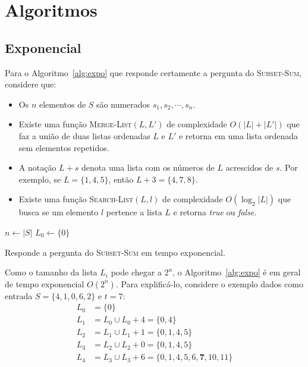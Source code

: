 \section{Algoritmos}

\subsection{Exponencial}

Para o Algoritmo~\ref{alg:expo} que responde certamente a pergunta do \textsc{Subset-Sum}, considere que:

\begin{itemize}
	\item Os $n$ elementos de $S$ são numerados ${s_1, s_2, \cdots, s_n}$.

	\item Existe uma função \textsc{Merge-List}$(L, L')$ de complexidade $O(|L| + |L'|)$ que faz a união de duas listas ordenadas $L$ e $L'$ e retorna em uma lista ordenada sem elementos repetidos.
	
	\item A notação $L + s$ denota uma lista com os números de $L$ acrescidos de $s$. Por exemplo, se $L = \{1, 4, 5\}$, então $L + 3 = \{4, 7, 8\}$.
	
	\item Existe uma função \textsc{Search-List}$(L, l)$ de complexidade $O(\log_{2} |L|)$ que busca se um elemento $l$ pertence a lista $L$ e retorna \textit{true} ou \textit{false}.
\end{itemize}

\begin{algorithm}[h]
	$n \leftarrow |S|$\;
	$L_0 \leftarrow \{0\}$\;
	\;
\caption{Responde a pergunta do \textsc{Subset-Sum} em tempo exponencial. \label{alg:expo}}
\end{algorithm}

Como o tamanho da lista $L_i$ pode chegar a $2^n$, o Algoritmo~\ref{alg:expo} é em geral de tempo exponencial $O(2^n)$. Para explificá-lo, considere o exemplo dados como entrada $S = \{4, 1, 0, 6, 2\}$ e $t = 7$:
	\begin{align*}
	L_0 & = \{0\} \\
	L_1 & = L_0 \cup L_0 + 4 = \{0, 4\} \\
	L_2 & = L_1 \cup L_1 + 1 = \{0, 1, 4, 5\} \\
	L_3 & = L_2 \cup L_2 + 0 = \{0, 1, 4, 5\} \\
	L_4 & = L_3 \cup L_3 + 6 = \{0, 1, 4, 5, 6, \mathbf{7}, 10, 11\}
	\end{align*}

